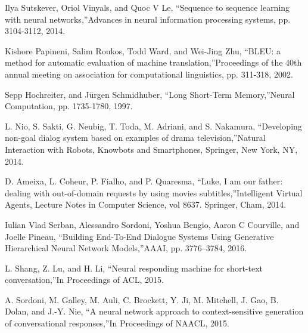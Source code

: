 \documentclass[conference]{IEEEtran}
\begin{document}
\begin{thebibliography}{00}

 Ilya Sutskever, Oriol Vinyals, and Quoc V Le, \textquotedblleft Sequence to sequence learning with neural networks,\textquotedblright \hspace{1mm}Advances in neural information processing systems, pp. 3104-3112, 2014.

 Kishore Papineni, Salim Roukos, Todd Ward, and Wei-Jing Zhu, \textquotedblleft BLEU: a method for automatic evaluation of machine translation,\textquotedblright \hspace{1mm}Proceedings of the 40th annual meeting on association for computational linguistics, pp. 311-318, 2002.

 Sepp Hochreiter, and J{\"u}rgen Schmidhuber, \textquotedblleft Long Short-Term Memory,\textquotedblright \hspace{1mm}Neural Computation, pp. 1735-1780, 1997.

 L. Nio, S. Sakti, G. Neubig, T. Toda, M. Adriani, and S. Nakamura, \textquotedblleft Developing non-goal dialog system based on examples of drama television,\textquotedblright \hspace{1mm}Natural Interaction with Robots, Knowbots and Smartphones, Springer, New York, NY, 2014.

 D. Ameixa, L. Coheur, P. Fialho, and P. Quaresma, \textquotedblleft Luke, I am our father: dealing with out-of-domain requests by using movies subtitles,\textquotedblright \hspace{1mm}Intelligent Virtual Agents, Lecture Notes in Computer Science, vol 8637. Springer, Cham, 2014.

 Iulian Vlad Serban, Alessandro Sordoni, Yoshua Bengio, Aaron C Courville, and Joelle Pineau, \textquotedblleft Building End-To-End Dialogue Systems Using Generative Hierarchical Neural Network Models,\textquotedblright \hspace{1mm}AAAI, pp. 3776--3784, 2016.

 L. Shang, Z. Lu, and H. Li, \textquotedblleft Neural responding machine for short-text conversation,\textquotedblright \hspace{1mm}In Proceedings of ACL, 2015.

 A. Sordoni, M. Galley, M. Auli, C. Brockett, Y. Ji, M. Mitchell, J. Gao, B. Dolan, and J.-Y. Nie, \textquotedblleft A neural network approach to context-sensitive generation of conversational responses,\textquotedblright \hspace{1mm}In Proceedings of NAACL, 2015.


\end{thebibliography}
\end{document}

